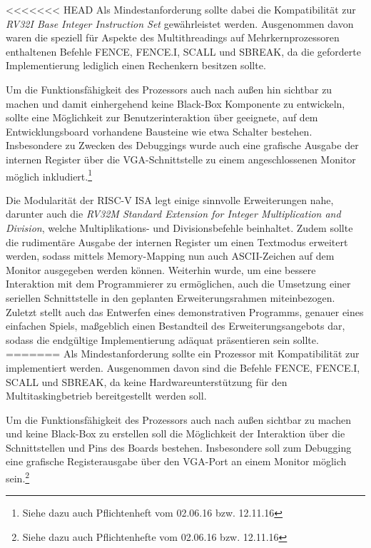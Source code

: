 <<<<<<< HEAD
Als Mindestanforderung sollte dabei die Kompatibilit\"at zur \textit{RV32I Base Integer Instruction Set} gew\"ahrleistet werden. Ausgenommen davon waren die speziell f\"ur Aspekte des Multithreadings auf Mehrkernprozessoren enthaltenen Befehle FENCE, FENCE.I, SCALL und SBREAK, da die geforderte Implementierung lediglich einen Rechenkern besitzen sollte.

Um die Funktionsf\"ahigkeit des Prozessors auch nach au{\ss}en hin sichtbar zu machen und damit einhergehend keine Black-Box Komponente zu entwickeln, sollte eine M\"oglichkeit zur Benutzerinteraktion \"uber geeignete, auf dem Entwicklungsboard vorhandene Bausteine wie etwa Schalter bestehen. Insbesondere zu Zwecken des Debuggings wurde auch eine grafische Ausgabe der internen Register \"uber die VGA-Schnittstelle zu einem angeschlossenen Monitor m\"oglich inkludiert.\footnote{Siehe dazu auch Pflichtenheft vom 02.06.16 bzw. 12.11.16}



Die Modularit\"at der RISC-V ISA legt einige sinnvolle Erweiterungen nahe, darunter auch die \textit{RV32M Standard Extension for Integer Multiplication and Division}, welche Multiplikations- und Divisionsbefehle beinhaltet. Zudem sollte die rudiment\"are Ausgabe der internen Register um einen Textmodus erweitert werden, sodass mittels Memory-Mapping nun auch ASCII-Zeichen auf dem Monitor ausgegeben werden k\"onnen. Weiterhin wurde, um eine bessere Interaktion mit dem Programmierer zu erm\"oglichen, auch die Umsetzung einer seriellen Schnittstelle in den geplanten Erweiterungsrahmen miteinbezogen. Zuletzt stellt auch das Entwerfen eines demonstrativen Programms, genauer eines einfachen Spiels, ma\ss{}geblich einen Bestandteil des Erweiterungsangebots dar, sodass die endg\"ultige Implementierung adäquat pr\"asentieren sein sollte.
=======
Als Mindestanforderung sollte ein Prozessor mit Kompatibilit\"at zur  implementiert werden. Ausgenommen davon sind die Befehle FENCE, FENCE.I, SCALL und SBREAK, da keine Hardwareunterst\"utzung f\"ur den Multitaskingbetrieb bereitgestellt werden soll.

Um die Funktionsf\"ahigkeit des Prozessors auch nach au{\ss}en sichtbar zu machen und keine Black-Box zu erstellen soll die M\"oglichkeit der Interaktion \"uber die Schnittstellen und Pins des Boards bestehen. Insbesondere soll zum Debugging eine grafische Registerausgabe \"uber den VGA-Port an einem Monitor m\"oglich sein.\footnote{Siehe dazu auch Pflichtenhefte vom 02.06.16 bzw. 12.11.16}


